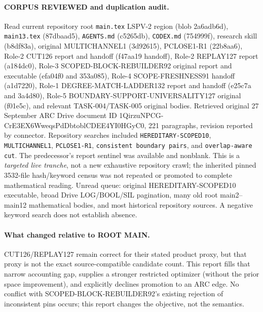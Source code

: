 \documentclass[11pt]{article}
\begin{document}
\paragraph{CORPUS REVIEWED and duplication audit.}
Read current repository root \texttt{main.tex} LSPV-2 region (blob 2a6adb6d), \texttt{main13.tex} (87dbaad5), \texttt{AGENTS.md} (c5265db), \texttt{CODEX.md} (754999f), research skill (b8df83a), original MULTICHANNEL1 (3d92615), PCLOSE1-R1 (22b8aa6), Role-2 CUT126 report and handoff (f47aa19 handoff), Role-2 REPLAY127 report (a184dc0), Role-3 SCOPED-BLOCK-REBUILDER92 original report and executable (efa04f0 and 353a085), Role-4 SCOPE-FRESHNESS91 handoff (a1d7220), Role-1 DEGREE-MATCH-LADDER132 report and handoff (e25c7a and 3a4d80), Role-5 BOUNDARY-SUPPORT-UNIVERSALITY127 original (f01e5c), and relevant TASK-004/TASK-005 original bodies. Retrieved original 27 September ARC Drive document ID 1QirzuNPCG-CrE3EX6WweqsPdDbtoblCDEE4YI0HGyC0, 221 paragraphs, revision reported by connector. Repository searches included \texttt{HEREDITARY-SCOPED10}, \texttt{MULTICHANNEL1}, \texttt{PCLOSE1-R1}, \texttt{consistent boundary pairs}, and \texttt{overlap-aware cut}. The predecessor's report sentinel was available and nonblank. This is a \emph{targeted live tranche}, not a new exhaustive repository crawl; the inherited pinned 3532-file hash/keyword census was not repeated or promoted to complete mathematical reading. Unread queue: original HEREDITARY-SCOPED10 executable, broad Drive LOG/BOOL/SIL pagination, many old root main2--main12 mathematical bodies, and most historical repository sources. A negative keyword search does not establish absence.

\paragraph{What changed relative to ROOT MAIN.}
CUT126/REPLAY127 remain correct for their stated product proxy, but that proxy is not the exact source-compatible candidate count. This report fills that narrow accounting gap, supplies a stronger restricted optimizer (without the prior space improvement), and explicitly declines promotion to an ARC edge. No conflict with SCOPED-BLOCK-REBUILDER92's existing rejection of inconsistent pins occurs; this report changes the objective, not the semantics.
\end{document}
